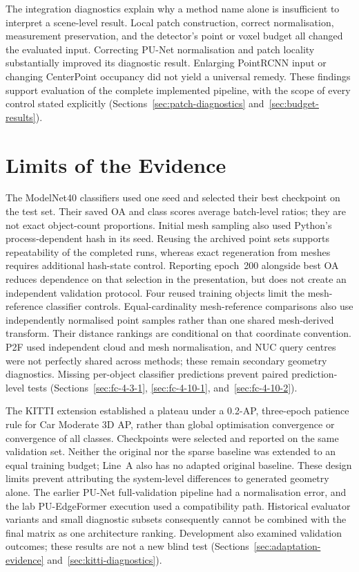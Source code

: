 The integration diagnostics explain why a method name alone is insufficient
to interpret a scene-level result. Local patch construction, correct
normalisation, measurement preservation, and the detector's point or voxel
budget all changed the evaluated input. Correcting PU-Net normalisation
and patch locality substantially improved its diagnostic result. Enlarging
PointRCNN input or changing CenterPoint occupancy did not yield a universal
remedy. These findings support evaluation of the complete implemented
pipeline, with the scope of every control stated explicitly
(Sections~\ref{sec:patch-diagnostics} and~\ref{sec:budget-results}).

\section{Limits of the Evidence}

The ModelNet40 classifiers used one seed and selected their best checkpoint
on the test set. Their saved OA and class scores average batch-level
ratios; they are not exact object-count proportions. Initial mesh sampling
also used Python's process-dependent hash in its seed. Reusing the archived
point sets supports repeatability of the completed runs, whereas exact
regeneration from meshes requires additional hash-state control. Reporting epoch~200 alongside best OA reduces dependence
on that selection in the presentation, but does not create an independent
validation protocol. Four reused training objects limit the mesh-reference
classifier controls. Equal-cardinality mesh-reference comparisons also
use independently normalised point samples rather than one shared
mesh-derived transform. Their distance rankings are conditional on that
coordinate convention. P2F used independent cloud and mesh normalisation,
and NUC query centres were not perfectly shared across methods; these
remain secondary geometry diagnostics. Missing per-object classifier
predictions prevent paired prediction-level tests
(Sections~\ref{sec:fc-4-3-1}, \ref{sec:fc-4-10-1},
and~\ref{sec:fc-4-10-2}).

The KITTI extension established a plateau under a 0.2-AP, three-epoch
patience rule for Car Moderate 3D AP, rather than global optimisation
convergence or convergence of all classes. Checkpoints were selected and
reported on the same validation set. Neither the original nor the sparse
baseline was extended to an equal training budget; Line~A also has no
adapted original baseline. These design limits prevent attributing the
system-level differences to generated geometry alone. The earlier
PU-Net full-validation pipeline had a normalisation error, and the lab
PU-EdgeFormer execution used a compatibility path. Historical evaluator
variants and small diagnostic subsets consequently cannot be combined
with the final matrix as one architecture ranking. Development also
examined validation outcomes; these results are not a new blind test
(Sections~\ref{sec:adaptation-evidence} and~\ref{sec:kitti-diagnostics}).

